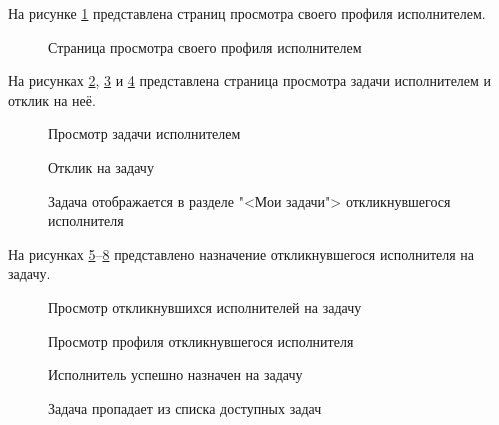 На рисунке \ref{t26:image} представлена страниц просмотра своего профиля исполнителем.
\clearpage

\begin{figure}[ht]
	\caption{Страница просмотра своего профиля исполнителем}
	\label{t26:image}
\end{figure}

На рисунках \ref{t27:image}, \ref{t28:image} и \ref{t29:image} представлена страница просмотра задачи исполнителем и отклик на неё.

\begin{figure}[ht]
	\caption{Просмотр задачи исполнителем}
	\label{t27:image}
\end{figure}

\begin{figure}[ht]
	\caption{Отклик на задачу}
	\label{t28:image}
\end{figure}

\begin{figure}[ht]
	\caption{Задача отображается в разделе "<Мои задачи"> откликнувшегося исполнителя}
	\label{t29:image}
\end{figure}

На рисунках \ref{t30:image}--\ref{t34:image} представлено назначение откликнувшегося исполнителя на задачу.

\begin{figure}[ht]
	\caption{Просмотр откликнувшихся исполнителей на задачу}
	\label{t30:image}
\end{figure}

\begin{figure}[ht]
	\caption{Просмотр профиля откликнувшегося исполнителя}
	\label{t31:image}
\end{figure}

\begin{figure}[ht]
	\caption{Исполнитель успешно назначен на задачу}
	\label{t32:image}
\end{figure}

\begin{figure}[ht]
	\caption{Задача пропадает из списка доступных задач}
	\label{t34:image}
\end{figure}

